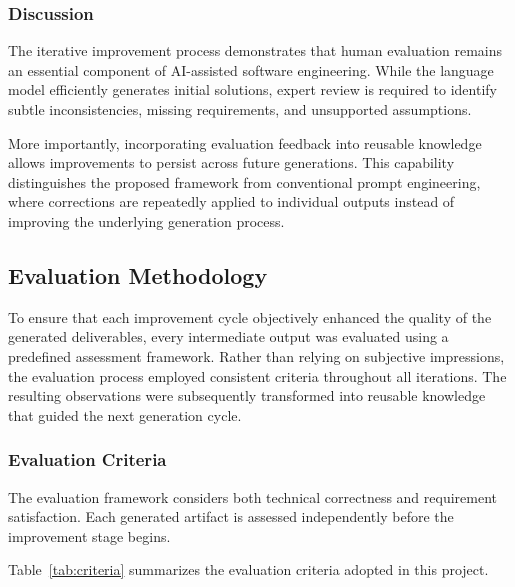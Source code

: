 \subsubsection{Discussion}

The iterative improvement process demonstrates that human evaluation remains an essential component of AI-assisted software engineering. While the language model efficiently generates initial solutions, expert review is required to identify subtle inconsistencies, missing requirements, and unsupported assumptions.

More importantly, incorporating evaluation feedback into reusable knowledge allows improvements to persist across future generations. This capability distinguishes the proposed framework from conventional prompt engineering, where corrections are repeatedly applied to individual outputs instead of improving the underlying generation process.



\subsection{Evaluation Methodology}

To ensure that each improvement cycle objectively enhanced the quality of the generated deliverables, every intermediate output was evaluated using a predefined assessment framework. Rather than relying on subjective impressions, the evaluation process employed consistent criteria throughout all iterations. The resulting observations were subsequently transformed into reusable knowledge that guided the next generation cycle.

\subsubsection{Evaluation Criteria}

The evaluation framework considers both technical correctness and requirement satisfaction. Each generated artifact is assessed independently before the improvement stage begins.

Table~\ref{tab:criteria} summarizes the evaluation criteria adopted in this project.

